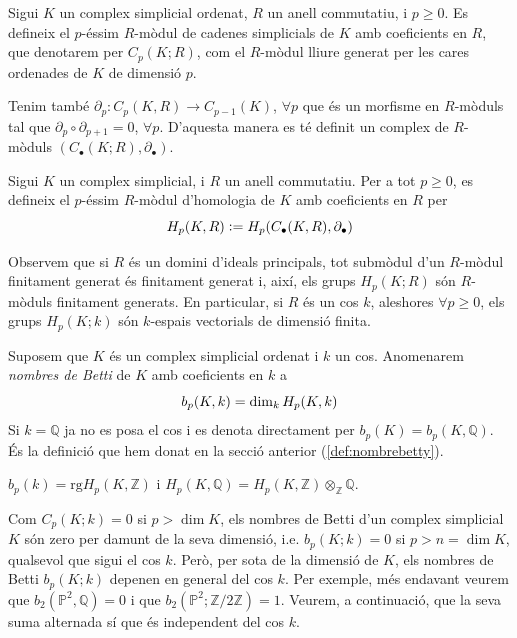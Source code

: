 \documentclass[../main.tex]{subfiles}
\begin{document}
\begin{defi}
 Sigui $K$ un complex simplicial ordenat, $R$ un anell commutatiu, i $p\geq 0$. Es defineix el $p$-éssim $R$-mòdul de cadenes simplicials de $K$ amb coeficients en $R$, que denotarem per $C_p(K;R)$, com el $R$-mòdul lliure generat per les cares ordenades de $K$ de dimensió $p$.
\end{defi}

Tenim també $\partial_p:C_p(K,R)\rightarrow C_{p-1}(K)$, $\forall p$ que és un morfisme en $R$-mòduls tal que $\partial_p\circ\partial_{p+1} = 0$, $\forall p$. D'aquesta manera es té definit un complex de $R$-mòduls $(C_\bullet(K;R),\partial_\bullet)$.

\begin{defi}
Sigui $K$ un complex simplicial, i $R$ un anell commutatiu. Per a tot $p\geq 0$, es defineix el $p$-éssim $R$-mòdul d'homologia de $K$ amb coeficients en $R$ per
\begin{equation}
    \notag
    H_p(K,R):=H_p(C_\bullet(K,R),\partial_\bullet)
\end{equation}
\end{defi}

Observem que si $R$ és un domini d'ideals principals, tot submòdul d'un $R$-mòdul finitament generat és finitament generat i, així, els grups $H_p(K;R)$ són $R$-mòduls finitament generats. En particular, si $R$ és un cos $k$, aleshores $\forall p\geq 0$, els grups $H_p(K;k)$ són $k$-espais vectorials de dimensió finita.



\begin{defi}
Suposem que $K$ és un complex simplicial ordenat i $k$ un cos. Anomenarem \textit{nombres de Betti} de $K$ amb coeficients en $k$ a
\begin{equation}
    \notag
    b_p(K,k) = \dim_kH_p(K,k)
\end{equation}
Si $k = \mathbb{Q}$ ja no es posa el cos i es denota directament per $b_p(K) = b_p(K,\mathbb{Q})$. És la definició que hem donat en la secció anterior (\ref{def:nombrebetty}).
\end{defi}

\begin{exercici}
$b_p(k) = \mathrm{rg}H_p(K,\mathbb{Z})$ i $H_p(K,\mathbb{Q}) = H_p(K,\mathbb{Z})\otimes_\mathbb{Z}\mathbb{Q}$.
\end{exercici}

Com $C_p(K;k) = 0$ si $p> \dim K$, els nombres de Betti d'un complex simplicial $K$ són zero per damunt de la seva dimensió, i.e. $b_p(K;k) = 0$ si $p>n = \dim K$, qualsevol que sigui el cos $k$. Però, per sota de la dimensió de $K$, els nombres de Betti $b_p(K;k)$ depenen en general del cos $k$. Per exemple, més endavant veurem que $b_2(\mathbb{P}^2,\mathbb{Q}) = 0$ i que $b_2(\mathbb{P}^2;\mathbb{Z}/2\mathbb{Z}) = 1$. Veurem, a continuació, que la seva suma alternada sí que és independent del cos $k$.
\end{document}
